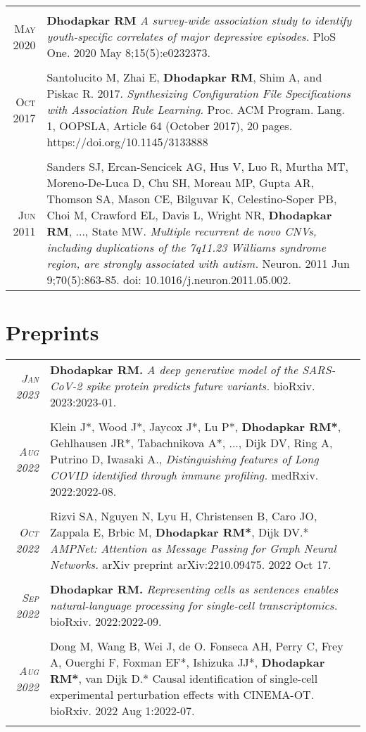 \documentclass[a4paper,10pt]{article}
\begin{document}
\begin{tabular}{rp{11cm}}
\multicolumn{2}{c}{} \\
 \textsc{May} 2020 & {\bf Dhodapkar RM} {\it A survey-wide association study to identify youth-specific correlates of major depressive episodes.} PloS One. 2020 May 8;15(5):e0232373. \\
\multicolumn{2}{c}{} \\
 \textsc{Oct} 2017 & Santolucito M, Zhai E, {\bf Dhodapkar RM}, Shim A, and Piskac R. 2017. {\it Synthesizing Configuration
File Specifications with Association Rule Learning.} Proc. ACM Program. Lang. 1, OOPSLA, Article 64
(October 2017), 20 pages. https://doi.org/10.1145/3133888 \\
\multicolumn{2}{c}{} \\
 \textsc{Jun} 2011 & Sanders SJ, Ercan-Sencicek AG, Hus V, Luo R, Murtha MT, Moreno-De-Luca D, Chu SH, Moreau MP, Gupta AR, Thomson SA, Mason CE, Bilguvar K, Celestino-Soper PB, Choi M, Crawford EL, Davis L, Wright NR, {\bf Dhodapkar RM}, ..., State MW. {\it Multiple recurrent de novo CNVs, including duplications of the 7q11.23 Williams syndrome region, are strongly associated with autism.} Neuron. 2011 Jun 9;70(5):863-85. doi: 10.1016/j.neuron.2011.05.002. 
\end{tabular}

\section{Preprints}
\begin{tabular}{rp{11cm}}
 \textit{\textsc{Jan} 2023}& {\bf Dhodapkar RM.} {\it A deep generative model of the SARS-CoV-2 spike protein predicts future variants.} bioRxiv. 2023:2023-01. \\
\multicolumn{2}{c}{} \\
 \textit{\textsc{Aug} 2022}& Klein J*, Wood J*, Jaycox J*, Lu P*, {\bf Dhodapkar RM*}, Gehlhausen JR*, Tabachnikova A*, ..., Dijk DV, Ring A, Putrino D, Iwasaki A., {\it Distinguishing features of Long COVID identified through immune profiling.} medRxiv. 2022:2022-08.\\
\multicolumn{2}{c}{} \\
 \textit{\textsc{Oct} 2022}& Rizvi SA, Nguyen N, Lyu H, Christensen B, Caro JO, Zappala E, Brbic M, {\bf Dhodapkar RM*}, Dijk DV.* {\it AMPNet: Attention as Message Passing for Graph Neural Networks.} arXiv preprint arXiv:2210.09475. 2022 Oct 17.
 \\
\multicolumn{2}{c}{} \\
 \textit{\textsc{Sep} 2022}& {\bf Dhodapkar RM.} {\it Representing cells as sentences enables natural-language processing for single-cell transcriptomics.} bioRxiv. 2022:2022-09.
 \\
\multicolumn{2}{c}{} \\
 \textit{\textsc{Aug} 2022}& Dong M, Wang B, Wei J, de O. Fonseca AH, Perry C, Frey A, Ouerghi F, Foxman EF*, Ishizuka JJ*, {\bf Dhodapkar RM*}, van Dijk D.* Causal identification of single-cell experimental perturbation effects with CINEMA-OT. bioRxiv. 2022 Aug 1:2022-07.
 \\
\multicolumn{2}{c}{}
\end{tabular}
\end{document}
